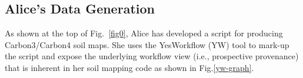 \documentclass[a4paper]{llncs}
\newcommand{\mytt}[1]{\ensuremath{\mathtt{#1}}}
\begin{document}
\subsection{Alice's Data Generation}




As shown at the top of Fig.~\ref{fig0}, Alice has developed a script for producing Carbon3/Carbon4 soil maps.  She uses the YesWorkflow (YW) tool to mark-up the script and expose the underlying workflow view (i.e., prospective provenance) that is inherent in her soil mapping code as shown in Fig.\ref{yw-graph}. 
\end{document}
